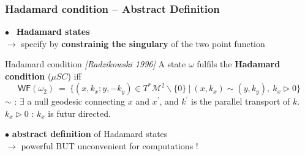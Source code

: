 \documentclass[9pt]{beamer}
\newcommand{\WF}{\mathsf{WF}}
\newcommand{\citebeam}[1]{\textit{\textcolor{black!60!white}{[#1]}}}
\newcommand{\Mcal}{\mathcal{M}}
\begin{document}
\begin{frame}

\frametitle{Hadamard condition -- Abstract Definition}

\vfill

$\bullet$ \ \textbf{Hadamard states} \\ 
\qquad $\to$ specify by \textbf{constrainig the singulary} of the two point function

\vfill

\begin{block}{Hadamard condition \citebeam{Radzikowski 1996}}
A state $\omega$ fulfils the \textbf{Hadamard condition} ($\mu S C$) iff
\begin{equation*}
 \WF(\omega_{2}) \ = \ \bigg\{ (x,k_x ; y,-k_y) \in T^\ast\Mcal^2 \backslash \{0\} \ \bigg| \ (x,k_x) \sim (y,k_y) , \ k_x \triangleright 0 \bigg\}
\end{equation*}
$\sim$ : $\exists$ a null geodesic connecting $x$ and $x^\prime$, and $k^\prime$ is the parallel transport of $k$. \\
$k_x \triangleright 0$ : $k_x$ is futur directed.
\end{block}

\vfill

$\bullet$ \textbf{abstract definition} of Hadamard states \\
\qquad $\to$ powerful BUT unconvenient for computations !

\vfill

\end{frame} 

\end{document}
